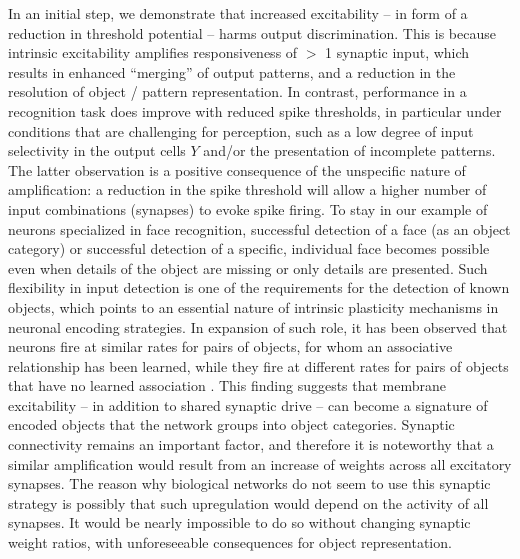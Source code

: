 In an initial step, we demonstrate that increased excitability
        -- in form of a reduction in threshold potential --
        harms output discrimination.
    This is because intrinsic excitability amplifies responsiveness of $>$ 1 synaptic input,
        which results in enhanced ``merging'' of output patterns,
        and  a reduction in the resolution of object / pattern representation.
    In contrast, performance in a recognition task does improve with reduced spike thresholds,
        in particular under conditions that are challenging for perception,
        such as a low degree of input selectivity in the output cells $Y$ and/or the presentation of incomplete patterns.
    The latter observation is a positive consequence of the unspecific nature of amplification:
        a reduction in the spike threshold will allow a higher number of input combinations (synapses) to evoke spike firing.
    To stay in our example of neurons specialized in face recognition,
        successful detection of a face (as an object category)
        or successful detection of a specific, individual face
        becomes possible even when details of the object are missing or only details are presented.
    Such flexibility in input detection is one of the requirements for the detection of known objects,
        which points to an essential nature of intrinsic plasticity mechanisms in neuronal encoding strategies.
    In expansion of such role, it has been observed that neurons fire
        at similar rates for pairs of objects,
            for whom an associative relationship has been learned,
        while they fire at different rates for pairs of objects
            that have no learned association \citep{Freedman2011-bo}.
    This finding suggests that membrane excitability
        -- in addition to shared synaptic drive --
        can become a signature of encoded objects that the network groups into object categories.
    Synaptic connectivity remains an important factor, and therefore it is noteworthy
        that a similar amplification would result from an increase of weights across all excitatory synapses.
    The reason why biological networks do not seem to use this synaptic strategy is possibly
        that such upregulation would depend on the activity of all synapses.
    It would be nearly impossible to do so without changing synaptic weight ratios,
        with unforeseeable consequences for object representation.

